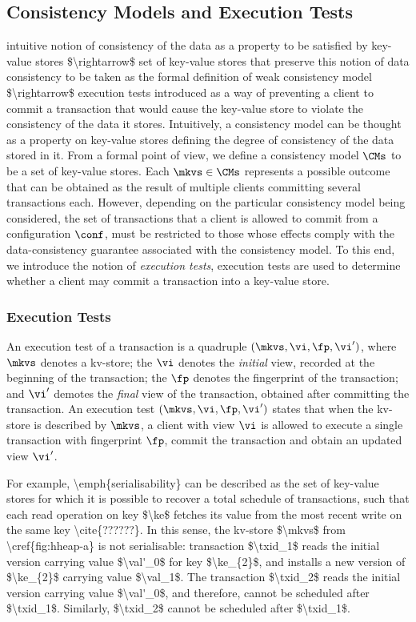 \subsection{Consistency Models and Execution Tests}
\ac{intuitive notion of consistency of the data as a 
property to be satisfied by key-value stores $\rightarrow$
set of key-value stores that preserve this notion of data consistency to be taken as the formal definition 
of weak consistency model $\rightarrow$ execution tests introduced as a way of preventing a client to commit 
a transaction that would cause the key-value store to violate the consistency of the data it stores.}
Intuitively, a consistency model can be thought as a property on key-value stores 
defining the degree of consistency of the data stored in it.
From a formal point of view, we define a consistency model 
$\CMs$ to be a set of key-value stores.  
Each $\mkvs \in \CMs$ represents a possible outcome that 
can be obtained as the result of multiple clients committing several transactions each. 
However, depending on the particular consistency model being considered, the set of transactions that a client is allowed to commit  
from a configuration $\conf$, must be restricted to those whose effects comply with the data-consistency guarantee associated with 
the consistency model. 
To this end, we introduce the notion of \emph{execution tests}, 
execution tests are used to determine whether a client may commit a transaction into a key-value store.

\subsubsection{Execution Tests}
An execution test of a transaction is a quadruple $(\mkvs, \vi, \fp, \vi')$, where $\mkvs$ denotes a kv-store;
the $\vi$ denotes the \emph{initial} view, recorded at the beginning of the transaction; 
the $\fp$ denotes the fingerprint of the transaction; and 
$\vi'$ demotes the \emph{final} view of the transaction, obtained after committing the transaction. 
An execution test $(\mkvs, \vi, \fp, \vi')$ states that when the kv-store is described by $\mkvs$, a client with view $\vi$ is allowed to execute a single transaction with fingerprint $\fp$, commit the transaction and obtain an updated view $\vi'$. 

\ac{
For example, \emph{serialisability} can be described as the set 
of key-value stores for which it is possible to recover a total schedule of transactions, 
such that each read operation on key $\ke$ fetches its value from the 
most recent write on the same key \cite{??????}.
In this sense, the kv-store $\mkvs$ from \cref{fig:hheap-a} is not serialisable: 
transaction $\txid_1$ reads the initial version carrying value $\val'_0$ for key $\ke_{2}$, 
and installs a new version of $\ke_{2}$ carrying value $\val_1$. The transaction $\txid_2$ 
reads the initial version carrying value $\val'_0$, and therefore, 
cannot be scheduled after $\txid_1$. Similarly, $\txid_2$ cannot be scheduled after $\txid_1$.
}

